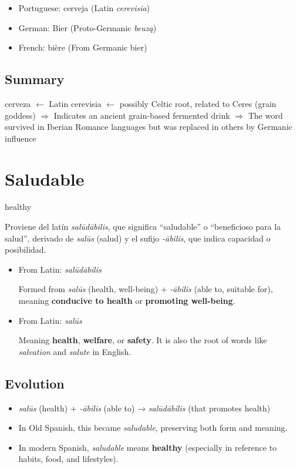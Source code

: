 \documentclass[10pt]{book}
\newcommand{\wordentry}[2]{
	\large #1
	\vspace{-0.5em}
	\begin{etymologybox}
		#2
	\end{etymologybox}
}
\let\oldsection\section
\renewcommand{\section}[1]{
	\needspace{8\baselineskip}
	\oldsection{#1}
}
\begin{document}
	\begin{itemize}
		\item Portuguese: cerveja (Latin \textit{cerevisia})
		
		\item German: Bier (Proto-Germanic \textit{beuzą})
		
		\item French: bière (From Germanic bier)
	\end{itemize}
	
	\subsection{Summary}
	
	cerveza $\leftarrow$ Latin cerevisia $\leftarrow$ possibly Celtic root, related to Ceres (grain goddess)
	$\Rightarrow$ Indicates an ancient grain-based fermented drink
	$\Rightarrow$ The word survived in Iberian Romance languages but was replaced in others by Germanic influence
	
	\section{Saludable}
	\wordentry{healthy}{
		Proviene del latín \textit{salūdābilis}, que significa “saludable” o “beneficioso para la salud”, derivado de \textit{salūs} (salud) y el sufijo \textit{-ābilis}, que indica capacidad o posibilidad.
		\begin{itemize}
			\item From Latin: \textit{salūdābilis}
			
			Formed from \textit{salūs} (health, well-being) + \textit{-ābilis} (able to, suitable for), meaning \textbf{conducive to health} or \textbf{promoting well-being}.
			
			\item From Latin: \textit{salūs}
			
			Meaning \textbf{health}, \textbf{welfare}, or \textbf{safety}. It is also the root of words like \textit{salvation} and \textit{salute} in English.
		\end{itemize}
	}
	
	\subsection*{Evolution}
	\begin{itemize}
		\item \textit{salūs} (health) + \textit{-ābilis} (able to) → \textit{salūdābilis} (that promotes health)
		\item In Old Spanish, this became \textit{saludable}, preserving both form and meaning.
		\item In modern Spanish, \textit{saludable} means \textbf{healthy} (especially in reference to habits, food, and lifestyles).
	\end{itemize}
	
\end{document}
